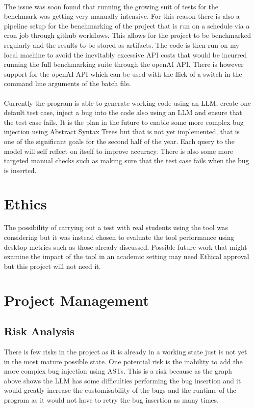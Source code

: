 \documentclass[12pt]{extarticle}
\begin{document}
\\
The issue was soon found that running the growing suit of tests for the benchmark was getting very manually intensive. For this reason there is also a pipeline setup for the benchmarking of the project that is run on a schedule via a cron job through github workflows. This allows for the project to be benchmarked regularly and the results to be stored as artifacts. The code is then run on my local machine to avoid the inevitably excessive API costs that would be incurred running the full benchmarking suite through the openAI API. There is however support for the openAI API which can be used with the flick of a switch in the command line arguments of the batch file.\\
\\
Currently the program is able to generate working code using an LLM, create one default test case, inject a bug into the code also using an LLM and ensure that the test case fails. It is the plan in the future to enable some more complex bug injection using Abstract Syntax Trees but that is not yet implemented, that is one of the significant goals for the second half of the year. Each query to the model will self reflect on itself to improve accuracy. There is also some more targeted manual checks such as making sure that the test case fails when the bug is inserted.

\section{Ethics}

The possibility of carrying out a test with real students using the tool was considering but it was instead chosen to evaluate the tool performance using desktop metrics such as those already discussed. Possible future work that might examine the impact of the tool in an academic setting may need Ethical approval but this project will not need it.

\section{Project Management}
\subsection{Risk Analysis}
There is few risks in the project as it is already in a working state just is not yet in the most mature possible state. One potential risk is the inability to add the more complex bug injection using ASTs. This is a risk because as the graph above shows the LLM has some difficulties performing the bug insertion and it would greatly increase the customisability of the bugs and the runtime of the program as it would not have to retry the bug insertion as many times. 
\end{document}
